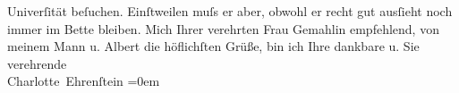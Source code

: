 \begin{ledgroupsized}[t]{13cm}
               Univerſität beſuchen. Einſtweilen muſs er aber, obwohl er recht gut ausſieht noch
               immer im Bette bleiben. Mich Ihrer verehrten Frau Gemahlin empfehlend, von meinem Mann u. Albert die höflichſten Grüße, bin ich Ihre\pend
           \pstart
           dankbare u. Sie verehrende{\\[\baselineskip]}\spacefill\mbox{Charlotte Ehrenſtein}\pend
           \leftskip=0em{}
         
         \endnumbering{}\end{ledgroupsized}  \newcommand{\dateiname}{L01591}\newcommand{\titel}{Charlotte Ehrenstein an Arthur Schnitzler, [16. 3.? 1906]}\newcommand{\editorInnen}{Martin Anton Müller und Gerd-Hermann Susen}
      